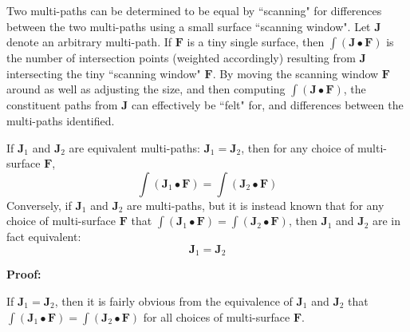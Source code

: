 Two multi-paths can be determined to be equal by ``scanning" for differences between the two multi-paths using a small surface ``scanning window". Let \(\mathbf{J}\) denote an arbitrary multi-path. If \(\mathbf{F}\) is a tiny single surface, then \(\int (\mathbf{J} \bullet \mathbf{F})\) is the number of intersection points (weighted accordingly) resulting from \(\mathbf{J}\) intersecting the tiny ``scanning window" \(\mathbf{F}\). By moving the scanning window \(\mathbf{F}\) around as well as adjusting the size, and then computing \(\int (\mathbf{J} \bullet \mathbf{F})\), the constituent paths from \(\mathbf{J}\) can effectively be ``felt" for, and differences between the multi-paths identified.  

\begin{thm}\label{thm:scanning_paths}
If \(\mathbf{J}_1\) and \(\mathbf{J}_2\) are equivalent multi-paths: \(\mathbf{J}_1 = \mathbf{J}_2\), then for any choice of multi-surface \(\mathbf{F}\), 
\[\int (\mathbf{J}_1 \bullet \mathbf{F}) = \int (\mathbf{J}_2 \bullet \mathbf{F})\]
Conversely, if \(\mathbf{J}_1\) and \(\mathbf{J}_2\) are multi-paths, but it is instead known that for any choice of multi-surface \(\mathbf{F}\) that 
\(\int (\mathbf{J}_1 \bullet \mathbf{F}) = \int (\mathbf{J}_2 \bullet \mathbf{F})\), then \(\mathbf{J}_1\) and \(\mathbf{J}_2\) are in fact equivalent:
\[\mathbf{J}_1 = \mathbf{J}_2\]  
\end{thm}
\textbf{Proof:}

If \(\mathbf{J}_1 = \mathbf{J}_2\), then it is fairly obvious from the equivalence of \(\mathbf{J}_1\) and \(\mathbf{J}_2\) that \(\int (\mathbf{J}_1 \bullet \mathbf{F}) = \int (\mathbf{J}_2  \bullet \mathbf{F})\) for all choices of multi-surface \(\mathbf{F}\). 

\vspace{5mm}

